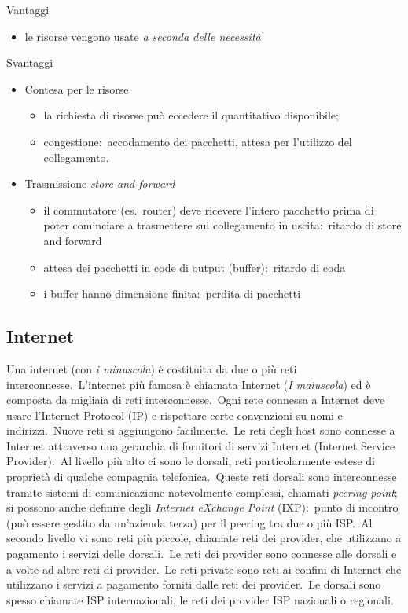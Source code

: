 \vspace{12pt}
\noindent Vantaggi
\begin{itemize}
    \item le risorse vengono usate \emph{a seconda delle necessità}
\end{itemize}
Svantaggi
\begin{itemize}
    \item Contesa per le risorse
          \begin{itemize}
              \item la richiesta di risorse può eccedere il quantitativo disponibile;
              \item congestione:\ accodamento dei pacchetti, attesa per l'utilizzo del collegamento.
          \end{itemize}
    \item Trasmissione \emph{store-and-forward}
          \begin{itemize}
              \item il commutatore (es.\ router) deve ricevere l'intero pacchetto prima di poter cominciare a trasmettere sul collegamento in uscita:\ ritardo di store and forward
              \item attesa dei pacchetti in code di output (buffer):\ ritardo di coda
              \item i buffer hanno dimensione finita:\ perdita di pacchetti
          \end{itemize}
\end{itemize}

\subsection{Internet}

Una internet (con \emph{i minuscola}) è costituita da due o più reti interconnesse.\
L'internet più famosa è chiamata Internet (\emph{I maiuscola}) ed è composta da migliaia di reti interconnesse.\
Ogni rete connessa a Internet deve usare l'Internet Protocol (IP) e rispettare certe convenzioni su nomi e indirizzi.\
Nuove reti si aggiungono facilmente.\
Le reti degli host sono connesse a Internet attraverso una gerarchia di fornitori di servizi Internet (Internet Service Provider).\
Al livello più alto ci sono le dorsali, reti particolarmente estese di proprietà di qualche compagnia telefonica.\
Queste reti dorsali sono interconnesse tramite sistemi di comunicazione notevolmente complessi, chiamati \emph{peering point}; si possono anche definire degli \emph{Internet eXchange Point} (IXP):\ punto di incontro (può essere gestito da un'azienda terza) per il peering tra due o più ISP.\
Al secondo livello vi sono reti più piccole, chiamate reti dei provider, che utilizzano a pagamento i servizi delle dorsali.\
Le reti dei provider sono connesse alle dorsali e a volte ad altre reti di provider.\
Le reti private sono reti ai confini di Internet che utilizzano i servizi a pagamento forniti dalle reti dei provider.\
Le dorsali sono spesso chiamate ISP internazionali, le reti dei provider ISP nazionali o regionali.

